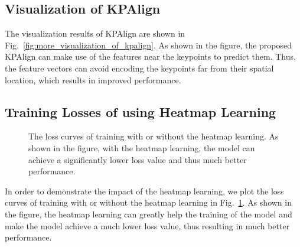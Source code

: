 \documentclass[10pt,twocolumn,letterpaper]{article}
\renewcommand{\texttt}[1]{}
\def\ie{{\it i.e.}\xspace}
\newcommand{\1}{{\mathbbm{1}}}
\begin{document}
{\subsection{Visualization of KPAlign}
The visualization results of KPAlign are shown in Fig.~\ref{fig:more_visualization_of_kpalign}. As shown in the figure, the proposed KPAlign can make use of the features near the keypoints to predict them. Thus, the feature vectors can avoid encoding the keypoints far from their spatial location, which results in improved performance.

\subsection{Training Losses of using Heatmap Learning}
\begin{figure}[t!]
\begin{center}
  \texttt{[image: figures/training\_losses.pdf]}
\end{center}
  \caption{The loss curves of training with or without the heatmap learning. As shown in the figure, with the heatmap learning, the model can achieve a significantly lower loss value and thus much better performance.}
\label{fig:training_losses}
\end{figure}
In order to demonstrate the impact of the heatmap learning, we plot the loss curves of training with or without the heatmap learning in Fig.~\ref{fig:training_losses}. As shown in the figure, the heatmap learning can greatly help the training of the model and make the model achieve a much lower loss value, thus resulting in much better performance.
\begin{figure*}[t]
\begin{center}
  \texttt{[image: figures/more\_kpalign\_visulization\_results.pdf]}
\end{center}
  \caption{Visualization results of KPAlign on MS-COCO \texttt{minival}. The first image in each group shows the outputs of the locator in KPAlign (\ie, the locations where the sampler samples the features used to predict the keypoints). The orange point denotes the original location where the features will be used if KPAlign is not used. The second image shows the final keypoint detection results. As shown in the figure, the proposed KPAlign can make use of the features near the keypoints to predict them. The final image shows that the ground-truth keypoints. Zoom in for a better look.}
\label{fig:more_visualization_of_kpalign}
\end{figure*}

}
\end{document}
